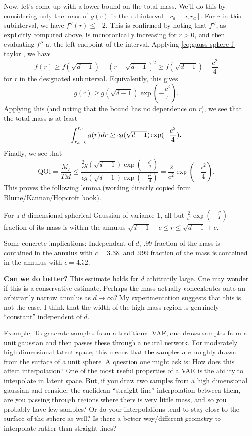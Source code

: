 Now, let's come up with a lower bound on the total mass. We'll do this by considering only the mass of $g(r)$ in the subinterval $[r_d-c, r_d]$. For $r$ in this subinterval, we have $f''(r) \leq -2$. This is confirmed by noting that $f''$, as explicitly computed above, is monotonically increasing for $r>0$, and then evaluating $f''$ at the left endpoint of the interval. Applying \eqref{eq:gauss-sphere-f-taylor}, we have 
$$
f(r) \geq f(\sqrt{d-1}) - (r-\sqrt{d-1})^2 \geq f(\sqrt{d-1}) - \frac{c^2}{4}
$$
for $r$ in the designated subinterval. 
Equivalently, this gives
$$
g(r) \geq g(\sqrt{d-1})\exp(- \frac{c^2}{4}). 
$$
Applying this (and noting that the bound has no dependence on $r$), we see that the total mass is at least
$$
\int_{r_d - c}^{r_d} g(r)\, dr  \geq cg(\sqrt{d-1})\exp(- \frac{c^2}{4}).
$$
Finally, we see that
 $$
\mbox{QOI} = \frac{M_{\bar I}}{TM} \leq \frac{\frac{2}{c}g(\sqrt{d-1})\exp(-\frac{c^2}{2})}{cg(\sqrt{d-1})\exp(- \frac{c^2}{4})} = \frac{2}{c^2}\exp(- \frac{c^2}{4}).
 $$
 This proves the following lemma (wording directly copied from Blume/Kannan/Hopcroft book). 
 \begin{lemma}
 For a $d$-dimensional spherical Gaussian of variance 1, all but $\frac{2}{c^2}\exp(- \frac{c^2}{4})$ fraction of its mass is within the annulus $\sqrt{d-1} - c \leq r \leq \sqrt{d-1} + c$. 
 \end{lemma}
 Some concrete implications: Independent of $d$, $.99$ fraction of the mass is contained in the annulus with $c = 3.38$. and $.999$ fraction of the mass is contained in the annulus with $c=4.32$. 
 
 \vspace{1em}
\noindent \textbf{Can we do better?} This estimate holds for $d$ arbitrarily large. One may wonder if this is a conservative estimate. Perhaps the mass actually concentrates onto an arbitrarily narrow annulus as $d\to \infty$? My experimentation suggests that this is not the case. I think that the width of the high mass region is genuinely ``constant'' independent of $d$. 
 
 Example: To generate samples from a traditional VAE, one draws samples from a unit gaussian and then passes these through a neural network. For moderately high dimensional latent space, this means that the samples are roughly drawn from the surface of a unit sphere. A question one might ask is: How does this affect interpolation? One of the most useful properties of a VAE is the ability to interpolate in latent space. But, if you draw two samples from a high dimensional gaussian and consider the euclidean ``straight line'' interpolation between them, are you passing through regions where there is very little mass, and so you probably have few samples? Or do your interpolations tend to stay close to the surface of the sphere as well? Is there a better way/different geometry to interpolate rather than straight lines?
 
